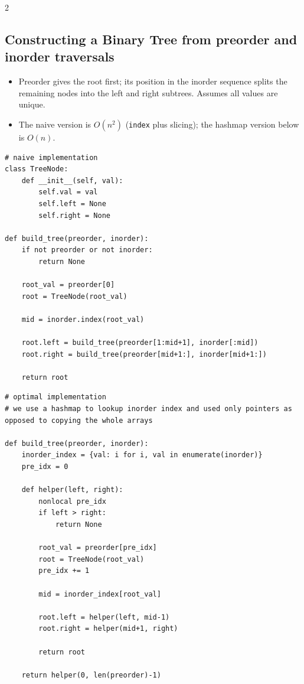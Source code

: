 \documentclass[9pt,a4paper]{extarticle}
\begin{document}
\begin{multicols}{2}
\subsection{Constructing a Binary Tree from preorder and inorder traversals}

\begin{itemize}
\item Preorder gives the root first; its position in the inorder sequence splits the remaining nodes into the left and right subtrees. Assumes all values are unique.
\item The naive version is $O(n^2)$ (\texttt{index} plus slicing); the hashmap version below is $O(n)$.
\end{itemize}

\begin{lstlisting}
# naive implementation
class TreeNode:
    def __init__(self, val):
        self.val = val
        self.left = None
        self.right = None

def build_tree(preorder, inorder):
    if not preorder or not inorder:
        return None

    root_val = preorder[0]
    root = TreeNode(root_val)

    mid = inorder.index(root_val)

    root.left = build_tree(preorder[1:mid+1], inorder[:mid])
    root.right = build_tree(preorder[mid+1:], inorder[mid+1:])

    return root
\end{lstlisting}

\begin{lstlisting}
# optimal implementation
# we use a hashmap to lookup inorder index and used only pointers as opposed to copying the whole arrays

def build_tree(preorder, inorder):
    inorder_index = {val: i for i, val in enumerate(inorder)}
    pre_idx = 0

    def helper(left, right):
        nonlocal pre_idx
        if left > right:
            return None

        root_val = preorder[pre_idx]
        root = TreeNode(root_val)
        pre_idx += 1

        mid = inorder_index[root_val]

        root.left = helper(left, mid-1)
        root.right = helper(mid+1, right)

        return root

    return helper(0, len(preorder)-1)
\end{lstlisting}


\end{multicols}
\end{document}
